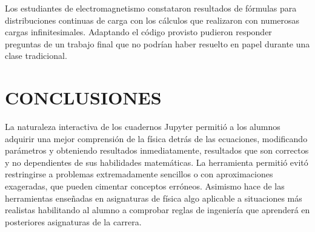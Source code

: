 \documentclass[a4paper]{fodami}        %
\begin{document}
Los estudiantes de electromagnetismo constataron resultados de fórmulas para distribuciones continuas de carga con los cálculos que realizaron con numerosas cargas infinitesimales.
Adaptando el código provisto pudieron responder preguntas de un trabajo final que no podrían haber resuelto en papel durante una clase tradicional. 



\section{CONCLUSIONES}

La naturaleza interactiva de los cuadernos Jupyter permitió a los alumnos adquirir una mejor comprensión de la física detrás de las ecuaciones, modificando parámetros y obteniendo resultados inmediatamente, resultados que son correctos y no dependientes de sus habilidades matemáticas.
La herramienta permitió evitó restringirse a problemas extremadamente sencillos o con aproximaciones exageradas, que pueden cimentar conceptos erróneos.
Asimismo hace de las herramientas enseñadas en asignaturas de física algo aplicable a situaciones más realistas habilitando al alumno a comprobar reglas de ingeniería que aprenderá en posteriores asignaturas de la carrera.

\end{document}
